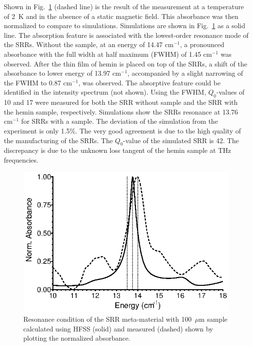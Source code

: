 Shown in Fig.~\ref{ch3-fig:resonator} (dashed line) is the result of the measurement at a temperature of 2~K and in the absence of a static magnetic field. This absorbance was then normalized to compare to simulations. Simulations are shown in Fig.~\ref{ch3-fig:resonator} as a solid line. The absorption feature is associated with the lowest-order resonance mode of the SRRs. \cite{Katsarakis04} Without the sample, at an energy of 14.47 cm$^{-1}$, a pronounced absorbance with the full width at half maximum (FWHM) of 1.45 cm$^{-1}$ was observed. After the thin film of hemin is placed on top of the SRRs, a shift of the absorbance to lower energy of 13.97 cm$^{-1}$, accompanied by a slight narrowing of the FWHM to 0.87 cm$^{-1}$, was observed. The absorptive feature could be identified in the intensity spectrum (not shown). Using the FWHM, $Q_0$-values of 10 and 17 were measured for both the SRR without sample and the SRR with the hemin sample, respectively. Simulations show the SRRs resonance at 13.76 cm$^{-1}$ for SRRs with a sample. The deviation of the simulation from the experiment is only 1.5\%. The very good agreement is due to the high quality of the manufacturing of the SRRs. The $Q_0$-value of the simulated SRR is 42. The discrepancy is due to the unknown loss tangent of the hemin sample at THz frequencies.


\begin{figure}[htp]\centering
  \includegraphics{Kapitel/Ch3-Images/03-SRR_Profile.eps}%
  \caption[Simulated and measured SRR resonance.]{Resonance condition of the SRR meta-material with 100~$\mu$m sample calculated using HFSS (solid) and measured (dashed) shown by plotting the normalized absorbance.}
  \label{ch3-fig:resonator}
\end{figure}

